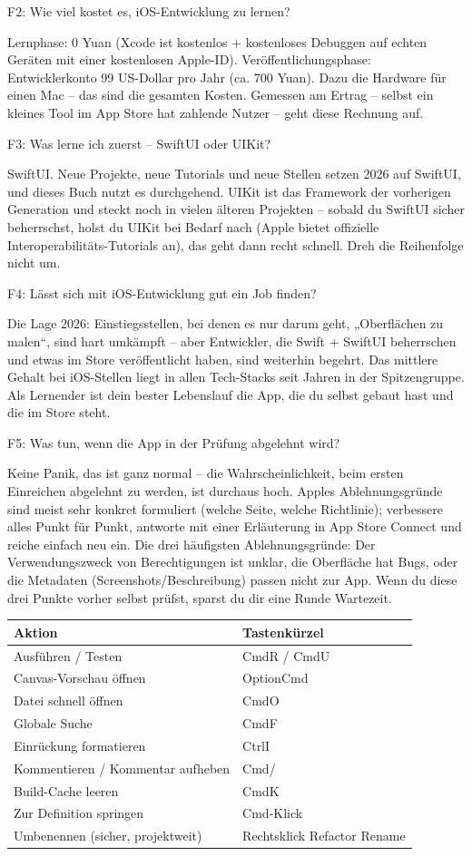 F2: Wie viel kostet es, iOS-Entwicklung zu lernen?

Lernphase: 0 Yuan (Xcode ist kostenlos + kostenloses Debuggen auf echten Geräten mit einer kostenlosen Apple-ID). Veröffentlichungsphase: Entwicklerkonto 99 US-Dollar pro Jahr (ca. 700 Yuan). Dazu die Hardware für einen Mac – das sind die gesamten Kosten. Gemessen am Ertrag – selbst ein kleines Tool im App Store hat zahlende Nutzer – geht diese Rechnung auf.

F3: Was lerne ich zuerst – SwiftUI oder UIKit?

SwiftUI. Neue Projekte, neue Tutorials und neue Stellen setzen 2026 auf SwiftUI, und dieses Buch nutzt es durchgehend. UIKit ist das Framework der vorherigen Generation und steckt noch in vielen älteren Projekten – sobald du SwiftUI sicher beherrschst, holst du UIKit bei Bedarf nach (Apple bietet offizielle Interoperabilitäts-Tutorials an), das geht dann recht schnell. Dreh die Reihenfolge nicht um.

F4: Lässt sich mit iOS-Entwicklung gut ein Job finden?

Die Lage 2026: Einstiegsstellen, bei denen es nur darum geht, „Oberflächen zu malen“, sind hart umkämpft – aber Entwickler, die Swift + SwiftUI beherrschen und etwas im Store veröffentlicht haben, sind weiterhin begehrt. Das mittlere Gehalt bei iOS-Stellen liegt in allen Tech-Stacks seit Jahren in der Spitzengruppe. Als Lernender ist dein bester Lebenslauf die App, die du selbst gebaut hast und die im Store steht.

F5: Was tun, wenn die App in der Prüfung abgelehnt wird?

Keine Panik, das ist ganz normal – die Wahrscheinlichkeit, beim ersten Einreichen abgelehnt zu werden, ist durchaus hoch. Apples Ablehnungsgründe sind meist sehr konkret formuliert (welche Seite, welche Richtlinie); verbessere alles Punkt für Punkt, antworte mit einer Erläuterung in App Store Connect und reiche einfach neu ein. Die drei häufigsten Ablehnungsgründe: Der Verwendungszweck von Berechtigungen ist unklar, die Oberfläche hat Bugs, oder die Metadaten (Screenshots/Beschreibung) passen nicht zur App. Wenn du diese drei Punkte vorher selbst prüfst, sparst du dir eine Runde Wartezeit.


\begin{center}
\begin{tabularx}{\linewidth}{|X|X|}
\hline
\textbf{Aktion} & \textbf{Tastenkürzel} \tabularnewline
\hline
Ausführen / Testen & CmdR / CmdU \tabularnewline
Canvas-Vorschau öffnen & OptionCmd \tabularnewline
Datei schnell öffnen & CmdO \tabularnewline
Globale Suche & CmdF \tabularnewline
Einrückung formatieren & CtrlI \tabularnewline
Kommentieren / Kommentar aufheben & Cmd/ \tabularnewline
Build-Cache leeren & CmdK \tabularnewline
Zur Definition springen & Cmd-Klick \tabularnewline
Umbenennen (sicher, projektweit) & Rechtsklick Refactor Rename \tabularnewline
\hline
\end{tabularx}
\end{center}

